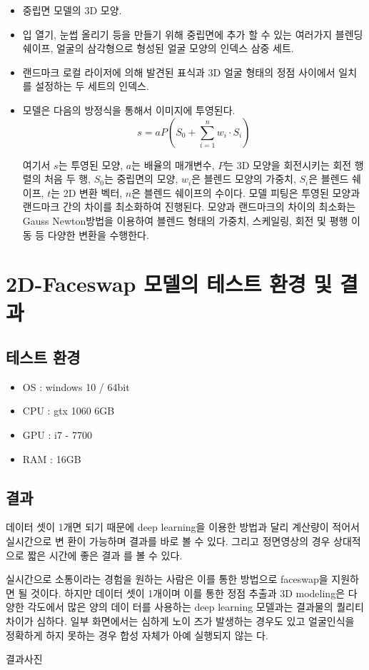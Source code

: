 \documentclass[chapter,oneside]{oblivoir}
\newcommand{\spec}{
    \begin{itemize}
        \item OS : windows 10 / 64bit
        \item CPU : gtx 1060 6GB
        \item GPU : i7 - 7700
        \item RAM : 16GB
    \end{itemize}
    }
\begin{document}
\begin{itemize}
    \item 중립면 모델의 3D 모양.
    \item 입 열기, 눈썹 올리기 등을 만들기 위해 중립면에 추가 할 수 있는 여러가지 블렌딩 쉐이프, 얼굴의 삼각형으로 형성된 얼굴 모양의 인덱스 삼중 세트.
    \item 랜드마크 로컬 라이저에 의해 발견된 표식과 3D 얼굴 형태의 정점 사이에서 일치를 설정하는 두 세트의 인덱스.
    \item 모델은 다음의 방정식을 통해서 이미지에 투영된다.
    \[ s = aP \left( S_{0} + \sum_{i=1}^{n} w_{i}\cdot S_{i}  \right)   \]

    여기서 $s$는 투영된 모양, $a$는 배율의 매개변수, $P$는 3D 모양을 회전시키는 회전 행렬의 처음 두 행, $S_0$는 중립면의 모양, $w_i$은 블렌드 모양의 가중치, $S_i$은 블렌드 쉐이프, $t$는 2D 변환 벡터, $n$은 블렌드 쉐이프의 수이다.
    모델 피팅은 투영된 모양과 랜드마크 간의 차이를 최소화하여 진행된다. 모양과 랜드마크의 차이의 최소화는 Gauss Newton방법을 이용하여 블렌드 형태의 가중치, 스케일링, 회전 및 평행 이동 등 다양한 변환을 수행한다.\cite{reference9}
\end{itemize}

\section{2D-Faceswap 모델의 테스트 환경 및 결과}

\subsection{테스트 환경}
\spec
\subsection{결과}

데이터 셋이 1개면 되기 때문에 deep learning을 이용한 방법과 달리 계산량이 적어서 실시간으로 변 환이 가능하며 결과를 바로 볼 수 있다. 그리고 정면영상의 경우 상대적으로 짧은 시간에 좋은 결과 를 볼 수 있다.

실시간으로 소통이라는 경험을 원하는 사람은 이를 통한 방법으로 faceswap을 지원하면 될 것이다.  하지만 데이터 셋이 1개이며 이를 통한 정점 추출과 3D modeling은 다양한 각도에서 많은 양의 데이 터를 사용하는 deep learning 모델과는 결과물의 퀄리티 차이가 심하다. 일부 화면에서는 심하게 노이 즈가 발생하는 경우도 있고 얼굴인식을 정확하게 하지 못하는 경우 합성 자체가 아예 실행되지 않는 다.

결과사진 
\end{document}
